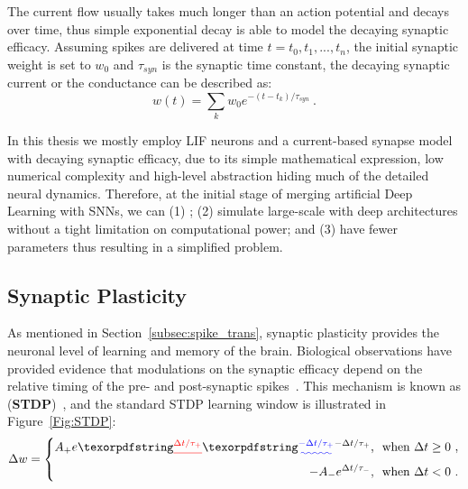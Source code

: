 The current flow usually takes much longer than an action potential and decays over time, thus \DIFdelbegin {}\DIFdelend \DIFaddbegin {}\DIFaddend simple exponential decay is able to model the decaying synaptic efficacy.
Assuming spikes are delivered at time $t={t_0, t_1, ..., t_n}$, the initial synaptic weight is set to $w_0$ and $\tau_{syn}$ is the synaptic time constant, the decaying synaptic current or the conductance can be described as:
\begin{equation}
w(t) = \sum_k w_0 e^{-(t-t_k)/\tau_{syn}}~.
\end{equation}

In this thesis we mostly employ LIF neurons and a current-based synapse model with decaying synaptic efficacy, due to its simple mathematical expression, low numerical complexity and high-level abstraction hiding much of the detailed neural dynamics.
Therefore, at the initial stage of merging artificial Deep Learning with \DIFdelbegin {}\DIFdelend \DIFaddbegin {}\DIFaddend SNNs, we can (1) \DIFdelbegin {}\DIFdelend \DIFaddbegin {}\DIFaddend ; (2) simulate large-scale \DIFdelbegin {}\DIFdelend \DIFaddbegin {}\DIFaddend with deep architectures without a tight limitation on computational power; and (3) have fewer parameters thus resulting in a simplified problem.


\subsection{Synaptic Plasticity}
\label{subsec:STDP}
As mentioned in Section~\ref{subsec:spike_trans}, synaptic plasticity provides the neuronal level of learning and \DIFaddbegin {}\DIFaddend memory of the brain.
Biological observations have provided evidence that modulations on the synaptic efficacy depend on the relative timing of the pre- and post-synaptic spikes~\citep{bi1998synaptic}.
This mechanism is known as \DIFdelbegin {}\DIFdelend \DIFaddbegin {}\DIFaddend (\textbf{STDP})~\citep{song2000competitive}, and the standard STDP learning window is illustrated in Figure~\ref{Fig:STDP}:
\begin{equation}
\Delta w = \left\{
\begin{aligned}
A_+ e\DIFdelbegin \DIFdel{^{\Delta t/\tau_+} }\DIFdelend \DIFaddbegin \DIFadd{^{-\Delta t/\tau_+} }\DIFaddend \textrm{,~~when~} \Delta t \geq 0~, \\
\DIFaddbegin {\DIFaddend -A\DIFaddbegin }\DIFaddend _- e^{\Delta t/\tau_-} \textrm{,~~when~} \Delta t < 0~.
\end{aligned}
\right.
\label{equ:stdp}
\end{equation}

